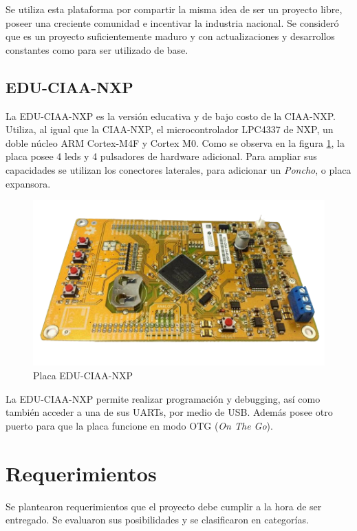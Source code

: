 Se utiliza esta plataforma por compartir la misma idea de ser un proyecto libre, poseer una creciente comunidad e incentivar la industria nacional. Se consideró que es un proyecto suficientemente maduro y con actualizaciones y desarrollos constantes como para ser utilizado de base.

\subsection{EDU-CIAA-NXP}
\label{subsec:eduCiaaNxp}
La EDU-CIAA-NXP es la versión educativa y de bajo costo de la CIAA-NXP. Utiliza, al igual que la CIAA-NXP, el microcontrolador LPC4337 de NXP, un doble núcleo ARM Cortex-M4F y Cortex M0. Como se observa en la figura \ref{fig:eduCiaaNxp}, la placa posee 4 leds y 4 pulsadores de hardware adicional. Para ampliar sus capacidades se utilizan los conectores laterales, para adicionar un \emph{Poncho}, o placa expansora.

\begin{figure}[h]
\centering
\includegraphics[scale=.5]{./Figures/edu-ciaa-nxp.png}
\caption{Placa EDU-CIAA-NXP}
\label{fig:eduCiaaNxp}
\end{figure}

La EDU-CIAA-NXP permite realizar programación y debugging, así como también acceder a una de sus UARTs, por medio de USB. Además posee otro puerto para que la placa funcione en modo OTG (\emph{On The Go}).

\section{Requerimientos}
\label{sec:requerimientos}
Se plantearon requerimientos que el proyecto debe cumplir a la hora de ser entregado. Se evaluaron sus posibilidades y se clasificaron en categorías.

